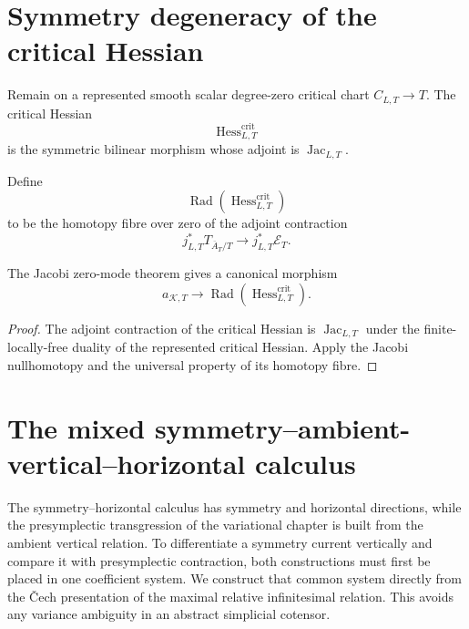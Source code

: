 \section{Symmetry degeneracy of the critical Hessian}
\label{sec:symmetry-noether-symmetry-degeneracy-of-the-critical-hessian}

Remain on a represented smooth scalar degree-zero critical chart
$C_{L,T}\to T$.  The critical Hessian
\[
\operatorname{Hess}_{L,T}^{\mathrm{crit}}
\]
is the symmetric bilinear morphism whose adjoint is
$\operatorname{Jac}_{L,T}$.

\begin{definition}
\label{def:symmetry-noether-homotopy-radical-of-the-critical-hessian}
Define
\[
\operatorname{Rad}
\left(
\operatorname{Hess}_{L,T}^{\mathrm{crit}}
\right)
\]
to be the homotopy fibre over zero of the adjoint contraction
\[
j_{L,T}^*T_{\overline A_T/T}
\longrightarrow
j_{L,T}^*\mathcal E_T.
\]
\end{definition}

\begin{corollary}
\label{cor:symmetry-noether-critical-symmetry-radical-factorization}
The Jacobi zero-mode theorem gives a canonical morphism
\[
\boxed{
a_{\mathcal K,T}
\longrightarrow
\operatorname{Rad}
\left(
\operatorname{Hess}_{L,T}^{\mathrm{crit}}
\right).
}
\]
\end{corollary}

\begin{proof}
The adjoint contraction of the critical Hessian is
$\operatorname{Jac}_{L,T}$ under the finite-locally-free duality of the represented
critical Hessian.  Apply the Jacobi nullhomotopy and the universal property of its
homotopy fibre.
\end{proof}

\section{The mixed symmetry--ambient-vertical--horizontal calculus}
\label{sec:symmetry-noether-the-mixed-symmetry-ambient-vertical-horizontal-calculus}

The symmetry--horizontal calculus has symmetry and horizontal directions, while the
presymplectic transgression of the variational chapter is built from the ambient
vertical relation.  To differentiate a symmetry current vertically and compare it
with presymplectic contraction, both constructions must first be placed in one
coefficient system.  We construct that common system directly from the \v{C}ech
presentation of the maximal relative infinitesimal relation.  This avoids any
variance ambiguity in an abstract simplicial cotensor.

